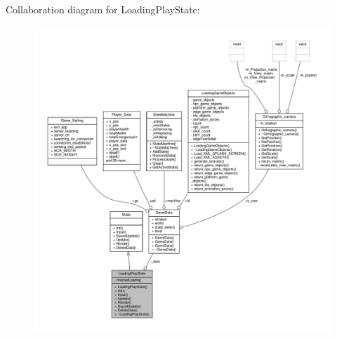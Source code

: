 Collaboration diagram for Loading\+Play\+State\+:
\nopagebreak
\begin{figure}[H]
\begin{center}
\leavevmode
\includegraphics[width=350pt]{classLoadingPlayState__coll__graph}
\end{center}
\end{figure}
